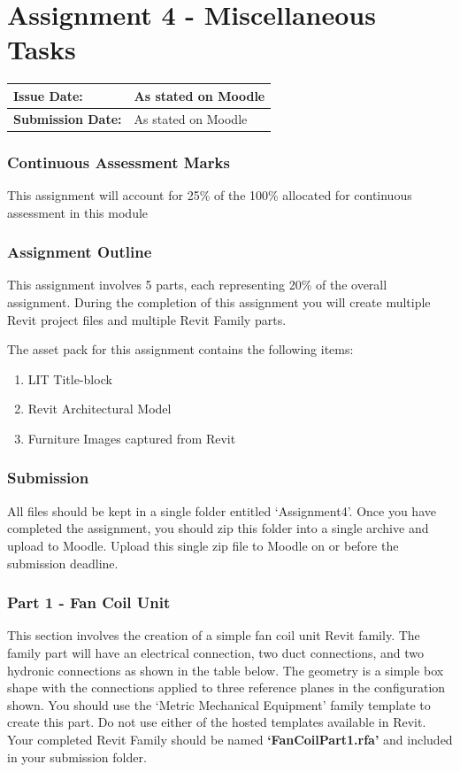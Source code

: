 
	
\part*{Assignment 4 - Miscellaneous Tasks}

\begin{tabularx}{\textwidth}{ |X|X| }
	\hline
	\textbf{Issue Date:} & As stated on Moodle \\
	\hline 
	\textbf{Submission Date:}  & As stated on Moodle  \\
	\hline
\end{tabularx}

\section*{Continuous Assessment Marks}
This assignment will account for 25\% of the 100\% allocated for continuous assessment in this module

\section*{Assignment Outline}
This assignment involves 5 parts, each representing 20\% of the overall assignment. During the completion of this assignment you will create multiple Revit project files and multiple Revit Family parts.


The asset pack for this assignment contains the following items:
\begin{enumerate}
	\item LIT Title-block
	\item Revit Architectural Model
	\item Furniture Images captured from Revit
\end{enumerate}


\section*{Submission}
All files should be kept in a single folder entitled ‘Assignment4’. Once you have completed the assignment, you should zip this folder into a single archive and upload to Moodle. Upload this single zip file to Moodle on or before the submission deadline.


\newpage

\section*{Part 1 - Fan Coil Unit}
This section involves the creation of a simple fan coil unit Revit family. The family part will have an electrical connection, two duct connections, and two hydronic connections as shown in the table below. The geometry is a simple box shape with the connections applied to three reference planes in the configuration shown. You should use the ‘Metric Mechanical Equipment’ family template to create this part. Do not use either of the hosted templates available in Revit.  Your completed Revit Family should be named \textbf{‘FanCoilPart1.rfa’} and included in your submission folder.\\

